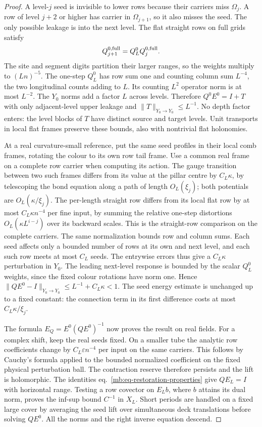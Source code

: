 \documentclass[11pt,letterpaper,reqno]{amsart}
\numberwithin{equation}{section}
\renewcommand{\eqref}[1]{\textup{eq.~\ref{#1}}}
\theoremstyle{definition}
\theoremstyle{remark}
\begin{document}
\begin{proof}
A level-\(j\) seed is invisible to lower rows because their
carriers miss \(\Omega_j\). A row of level \(j+2\) or higher
has carrier in \(\Omega_{j+1}\), so it also misses the seed.
The only possible leakage is into the next level.
The flat straight rows on full grids satisfy
\begin{equation}\label{mb:eq-flat-row-composition}
                    Q_{j+1}^{0,\rm full}=Q_L^0 Q_j^{0,\rm full}.
\end{equation}
The site and segment digits partition their larger ranges,
so the weights multiply to \((Ln)^{-5}\).
The one-step \(Q_L^0\) has row sum one and counting column
sum \(L^{-4}\), the two longitudinal counts adding to \(L\).
Its counting \(L^2\) operator norm is at most \(L^{-2}\).
The \(Y_0\) norms add a factor \(L\) across levels. Therefore
\(Q^0 E^0=I+T\) with only adjacent-level upper leakage and
\(\|T\|_{Y_0\to Y_0}\le L^{-1}\). No depth factor enters:
the level blocks of \(T\) have distinct source and target
levels. Unit transports in local flat frames preserve these
bounds, also with nontrivial flat holonomies.

At a real curvature-small reference, put the same seed
profiles in their local comb frames, rotating the colour
to its own row tail frame. Use a common real frame on a
complete row carrier when computing its action. The gauge
transition between two such frames differs from its value
at the pillar centre by \(C_L\kappa\), by telescoping the
bond equation along a path of length \(O_L(\xi_j)\);
both potentials are \(O_L(\kappa/\xi_j)\).
The per-length straight row differs from its local flat row
by at most \(C_L\kappa n^{-4}\) per fine input, by summing
the relative one-step distortions
\(O_L(\kappa L^{i-j})\) over its backward scales. This is the
straight-row comparison on the complete carriers. The same
normalization bounds row and column sums. Each seed affects
only a bounded number of rows at its own and next level,
and each such row meets at most \(C_L\) seeds.
The entrywise errors thus give a \(C_L\kappa\) perturbation
in \(Y_0\). The leading next-level response is bounded by
the scalar \(Q_L^0\) weights, since the fixed colour
rotations have norm one. Hence
\(\|QE^0-I\|_{Y_0\to Y_0}\le L^{-1}+C_L\kappa<1\).
The seed energy estimate is unchanged up to a fixed constant:
the connection term in its first difference costs at most
\(C_L\kappa/\xi_j\).

The formula \(E_Q=E^0(QE^0)^{-1}\) now proves the result
on real fields. For a complex shift, keep the real seeds
fixed. On a smaller tube the analytic row coefficients
change by \(C_L\varepsilon n^{-4}\) per input on the same
carriers. This follows by Cauchy's formula applied to the
bounded normalized coefficient on the fixed physical
perturbation ball. The contraction reserve therefore
persists and the lift is holomorphic. The identities
\eqref{mb:eq-restoration-properties} give \(QE_L=I\) with
horizontal range. Testing a row covector on \(E_L b\),
where \(b\) attains its dual norm, proves the inf-sup
bound \(C^{-1}\) in \(X_L\). Short periods are handled
on a fixed large cover by averaging the seed lift over
simultaneous deck translations before solving \(QE^0\).
All the norms and the right inverse equation descend.
\end{proof}
\end{document}
